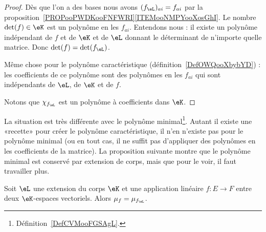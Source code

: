 \begin{proof}
    Dès que l'on a des bases nous avons \( (f_{\eL})_{ai}=f_{ai}\) par la proposition~\ref{PROPooPWDKooFNFWRI}\ref{ITEMooNMPYooXosGhI}. Le nombre \( \det(f)\in \eK\) est un polynôme en les \( f_{ai}\). Entendons nous : il existe un polynôme indépendant de \( f\) et de \( \eK\) et de \( \eL\) donnant le déterminant de n'importe quelle matrice. Donc \( \det(f)=\det(f_{\eL})\).

    Même chose pour le polynôme caractéristique (définition~\ref{DefOWQooXbybYD}) : les coefficients de ce polynôme sont des polynômes en les \( f_{ai}\) qui sont indépendants de \( \eL\), de \( \eK\) et de \( f\).

    Notons que \( \chi_{f_{\eL}}\) est un polynôme à coefficients dans \( \eK\).
\end{proof}

La situation est très différente avec le polynôme minimal\footnote{Définition~\ref{DefCVMooFGSAgL}.}. Autant il existe une «recette» pour créer le polynôme caractéristique, il n'en n'existe pas pour le polynôme minimal (ou en tout cas, il ne suffit pas d'appliquer des polynômes en les coefficients de la matrice). La proposition suivante montre que le polynôme minimal est conservé par extension de corps, mais que pour le voir, il faut travailler plus.

\begin{proposition}      \label{PROPooXVZMooXcJrsJ}
    Soit \( \eL\) une extension du corps \( \eK\) et une application linéaire \( f\colon E\to F\) entre deux \( \eK\)-espaces vectoriels. Alors \( \mu_f=\mu_{f_{\eL}}\).
\end{proposition}

